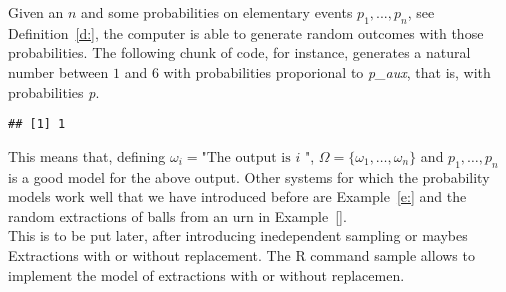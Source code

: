 	Given an $n$ and some probabilities on elementary events $p_1,..., p_n$, see Definition~\ref{d:}, the computer is able to generate random outcomes with those probabilities. The following chunk of code, for instance, generates a natural number between $1$ and $6$ with probabilities proporional to \textit{p\_aux}, that is, with probabilities \textit{p}.  
\begin{knitrout}
\color{fgcolor}\begin{kframe}
\begin{alltt}
 \hlkwb{<-}   
 \hlkwb{<-} \hldef{(}\hldef{,}\hldef{,}\hldef{,}\hldef{,}\hldef{,}\hldef{)} 
 \hlkwb{<-} \hlopt{/} 
\hldef{(}\hlopt{:} \hldef{,}   
\end{alltt}
\begin{verbatim}
## [1] 1
\end{verbatim}
\end{kframe}
\end{knitrout}
	
	This means that,  defining $\omega_i = \text{"The output is $i$ "}$, $\Omega = \{\omega_1, \ldots ,\omega_n\}$ and $p_1,\ldots, p_n$ is a good model for the above output. Other systems for which the probability models work well that we have introduced before are Example~\ref{e:} and the random extractions of balls from an urn in Example~\ref{}.\\

	This is to be put later, after introducing  inedependent sampling or maybes  
	Extractions with or without replacement. The R command sample allows to implement the model of extractions with or without replacemen.
	
